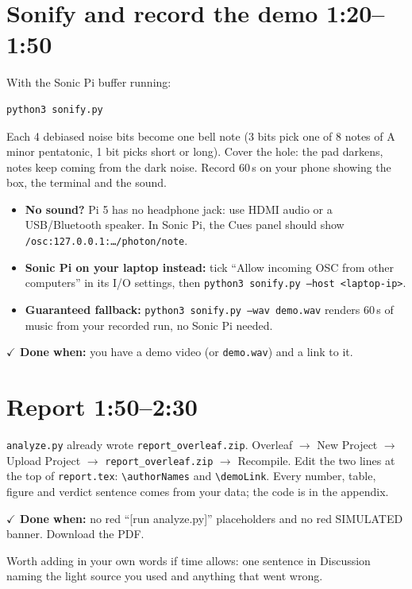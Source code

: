 \documentclass[11pt]{article}
\newcommand{\done}[1]{\par\smallskip\textcolor{ok}{\textbf{\(\checkmark\) Done when:}} #1\par}
\newcommand{\clock}[1]{\hfill\textcolor{black!55}{\small\textbf{#1}}}
\begin{document}
\section{Sonify and record the demo \clock{1:20--1:50}}
With the Sonic Pi buffer running:
\begin{lstlisting}
python3 sonify.py
\end{lstlisting}
Each 4 debiased noise bits become one bell note (3 bits pick one of 8 notes of A minor pentatonic, 1 bit
picks short or long). Cover the hole: the pad darkens, notes keep coming from the dark noise.
Record 60\,s on your phone showing the box, the terminal and the sound.
\begin{itemize}
\item \textbf{No sound?} Pi 5 has no headphone jack: use HDMI audio or a USB/Bluetooth speaker. In Sonic Pi,
  the Cues panel should show \texttt{/osc:127.0.0.1:\dots/photon/note}.
\item \textbf{Sonic Pi on your laptop instead:} tick ``Allow incoming OSC from other computers'' in its I/O
  settings, then \texttt{python3 sonify.py --host <laptop-ip>}.
\item \textbf{Guaranteed fallback:} \texttt{python3 sonify.py --wav demo.wav} renders 60\,s of music from your
  recorded run, no Sonic Pi needed.
\end{itemize}
\done{you have a demo video (or \texttt{demo.wav}) and a link to it.}

\section{Report \clock{1:50--2:30}}
\texttt{analyze.py} already wrote \texttt{report\_overleaf.zip}.
Overleaf $\rightarrow$ New Project $\rightarrow$ Upload Project $\rightarrow$ \texttt{report\_overleaf.zip} $\rightarrow$ Recompile.
Edit the two lines at the top of \texttt{report.tex}: \verb|\authorNames| and \verb|\demoLink|.
Every number, table, figure and verdict sentence comes from your data; the code is in the appendix.
\done{no red ``[run analyze.py]'' placeholders and no red SIMULATED banner. Download the PDF.}

Worth adding in your own words if time allows: one sentence in Discussion naming the light source you used
and anything that went wrong.


\end{document}
